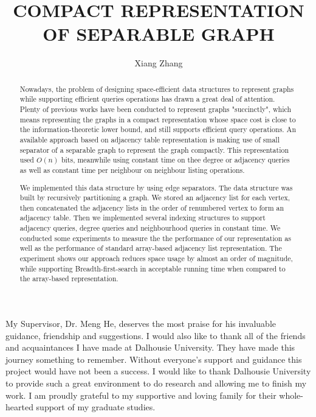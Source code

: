 \documentclass[12pt,glossary]{dalthesis}
\begin{document}
\macs  %
\title{COMPACT REPRESENTATION OF SEPARABLE GRAPH}
\author{Xiang Zhang}





\frontmatter





\begin{abstract}
Nowadays, the problem of designing space-efficient data structures to represent graphs while supporting efficient queries operations has drawn a great deal of attention. Plenty of previous works have been conducted to represent graphs "succinctly", which means representing the graphs in a compact representation whose space cost is close to the information-theoretic lower bound, and still supports efficient query operations. An available approach based on adjacency table representation is making use of small separator of a separable graph to represent the graph compactly. This representation used $O(n)$ bits, meanwhile using constant time on thee degree or adjacency queries as well as constant time per neighbour on neighbour listing operations.


We implemented this data structure by using edge separators. The data structure was built by recursively partitioning a graph. We stored an adjacency list for each vertex, then concatenated the adjacency lists in the order of renumbered vertex to form an adjacency table. Then we implemented several indexing structures to support adjacency queries, degree queries and neighbourhood queries in constant time. We conducted some experiments to measure the the performance of our representation as well as the performance of standard array-based adjacency list representation. The experiment shows our approach reduces space usage by almost an order of magnitude, while supporting Breadth-first-search in acceptable running time when compared to the array-based representation.
\end{abstract}

\printglossary

\begin{acknowledgements}
My Supervisor, Dr. Meng He, deserves the most praise for his invaluable guidance, friendship and suggestions. I would also like to thank all of the friends and acquaintances I have made at Dalhousie University. They have made this journey something to remember. Without everyone’s support and guidance this project would have not been a success.
I would like to thank Dalhousie University to provide such a great environment
to do research and allowing me to finish my work.
I am proudly grateful to my supportive and loving family for their whole-hearted
support of my graduate studies.
\end{acknowledgements}
\end{document}
